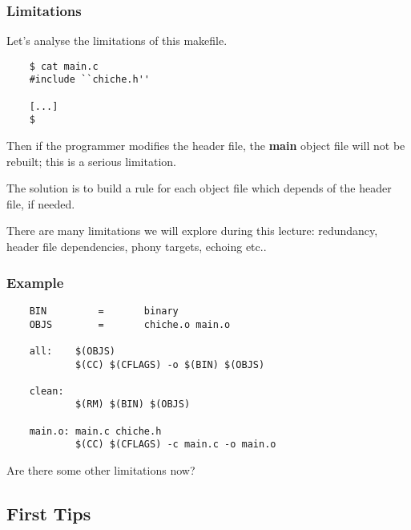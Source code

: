 \documentclass[8pt]{beamer}
\newcommand{\nl}[0]{\vspace{0.4cm}}
\begin{document}
\begin{frame}[containsverbatim]
  \frametitle{Limitations}

  Let's analyse the limitations of this makefile.

  \begin{verbatim}
    $ cat main.c
    #include ``chiche.h''

    [...]
    $ 
  \end{verbatim}

  Then if the programmer modifies the header file, the \textbf{main} object
  file will not be rebuilt; this is a serious limitation.

  \nl

  The solution is to build a rule for each object file which depends of
  the header file, if needed.

  \nl

  There are many limitations we will explore during this lecture:
  redundancy, header file dependencies, phony targets, echoing etc..
\end{frame}


\begin{frame}[containsverbatim]
  \frametitle{Example}

  \begin{verbatim}
    BIN         =       binary
    OBJS        =       chiche.o main.o

    all:    $(OBJS)
            $(CC) $(CFLAGS) -o $(BIN) $(OBJS)

    clean:
            $(RM) $(BIN) $(OBJS)

    main.o: main.c chiche.h
            $(CC) $(CFLAGS) -c main.c -o main.o
  \end{verbatim}

  Are there some other limitations now?
\end{frame}

%
%

\subsection{First Tips}

\end{document}
